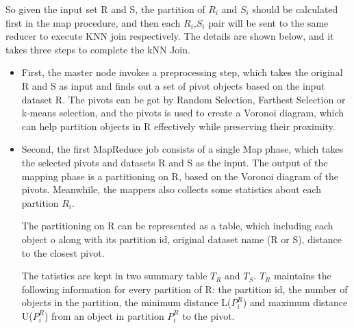 \documentclass[conference]{IEEEtran}
\begin{document}
	So given the input set R and S, the partition of $R_i$ and $S_i$ should be calculated first in the map procedure, and then each $R_i$,$S_i$ pair will be sent to the same reducer to execute KNN join respectively.
	The details are shown below, and it takes three steps to complete the kNN Join. 
	\begin{itemize}
		\item First, the master node invokes a preprocessing step, which takes the original R and S as input and finds out a set of pivot objects based on the input dataset R. The pivots can be got by Random Selection, Farthest Selection or k-means selection, and the pivots is used to create a Voronoi diagram, which can help partition objects in R effectively while preserving their proximity. 
		
		\item Second, the first MapReduce job consists of a single Map phase, which takes the selected pivots and datasets R and S as the input. The output of the mapping phase is a partitioning on R, based on the Voronoi diagram of the pivots. Meanwhile, the mappers also  collects some statistics about each partition $R_i$.
		
		The partitioning on R can be represented as a table, which including each object o along with its partition id, original dataset name (R or S), distance to the closest pivot.
		
		The tatistics are kept in two summary table $T_R$ and $T_S$. $T_R$ maintains the following information for every partition of R: the partition id, the number of objects in the partition, the minimum distance L($P_i^R$) and maximum distance U($P_i^R$) from an object in partition $P_i^R$ to the pivot.
	\end{itemize}
\end{document}
